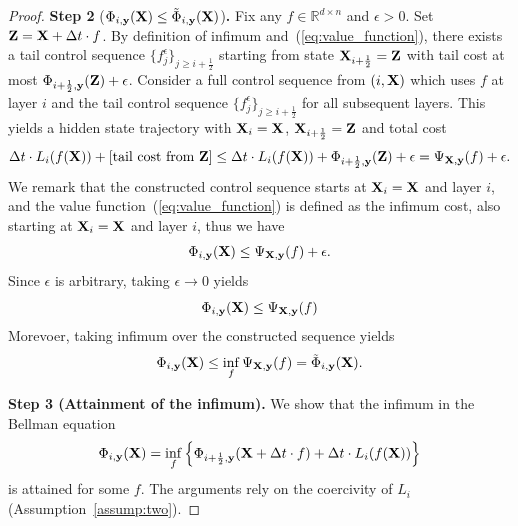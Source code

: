 \documentclass[journal]{IEEEtran}
\def\eqref#1{equation~\ref{#1}}
\newcommand{\bfX}{{\bf X}}
\newcommand{\bfZ}{{\bf Z}}
\newcommand{\bfy}{ {\bf y}}
\renewcommand{\eqref}[1]{(\ref{#1})}
\theoremstyle{plain}
\theoremstyle{definition}
\theoremstyle{remark}
\begin{document}
\begin{proof}
    \textbf{Step 2} (${\Phi}_{i, \bfy}(\bfX) \leq \tilde{\Phi}_{i, \bfy}(\bfX)$)\textbf{.} Fix any $f \in \mathbb{R}^{d \times n}$ and $\epsilon > 0$. Set $\bfZ=\bfX + \Delta t \cdot f$. By definition of infimum and~\eqref{eq:value_function}, there exists a tail control sequence $\{ f_{j}^\epsilon \}_{j \geq i+\frac{1}{2}}$ starting from state $\bfX_{i+\frac{1}{2}}=\bfZ$ with tail cost at most $\Phi_{i+\frac{1}{2}, \bfy}(\bfZ) + \epsilon$. Consider a full control sequence from $(i, \bfX)$ which uses $f$ at layer $i$ and the tail control sequence $\{ f_{j}^\epsilon \}_{j \geq i+\frac{1}{2}}$ for all subsequent layers. This yields a hidden state trajectory with $\bfX_i=\bfX$, $\bfX_{i+\frac{1}{2}}=\bfZ$ and total cost
    \begin{equation}
        \Delta t \cdot L_i(f(\bfX)) + [\text{tail cost from $\bfZ$}] \leq \Delta t \cdot L_i(f(\bfX)) + \Phi_{i+\frac{1}{2}, \bfy}(\bfZ) +\epsilon = \Psi_{\bfX, \bfy}(f) + \epsilon.
    \end{equation}
    We remark that the constructed control sequence starts at $\bfX_i=\bfX$ and layer $i$, and the value function~\eqref{eq:value_function} is defined as the infimum cost, also starting at $\bfX_i=\bfX$ and layer $i$, thus we have
    \begin{equation}
        \Phi_{i, \bfy}(\bfX) \leq \Psi_{\bfX, \bfy}(f) + \epsilon.
    \end{equation}
    Since $\epsilon$ is arbitrary, taking $\epsilon \to 0$ yields
    \begin{equation}
        \Phi_{i, \bfy}(\bfX) \leq \Psi_{\bfX, \bfy}(f)
    \end{equation}
    Morevoer, taking infimum over the constructed sequence yields
    \begin{equation}
        \Phi_{i, \bfy}(\bfX) \leq \inf_f\Psi_{\bfX, \bfy}(f) =  \tilde{\Phi}_{i, \bfy}(\bfX).
    \end{equation}

    \textbf{Step 3 (Attainment of the infimum).} We show that the infimum in the Bellman equation
    \[
    {\Phi}_{i, \bfy}(\bfX) = \inf_{f} \left\{ \Phi_{i+\frac{1}{2}, \bfy}(\bfX + \Delta t \cdot f) + \Delta t \cdot L_i(f(\bfX)) \right\}
    \]
    is attained for some $f$. The arguments rely on the coercivity of $L_i$ (Assumption~\ref{assump:two}).


\end{proof}
\end{document}
